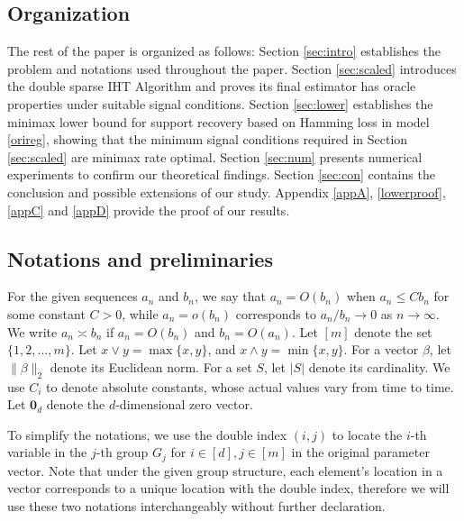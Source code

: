 \documentclass[12pt]{article}
\begin{document}
\subsection{Organization} 
The rest of the paper is organized as follows:
Section \ref{sec:intro} establishes the problem and notations used throughout the paper.
Section \ref{sec:scaled} introduces the double sparse IHT Algorithm and proves its final estimator has oracle properties under suitable signal conditions.
Section \ref{sec:lower} establishes the minimax lower bound for support recovery based on Hamming loss in model \eqref{orireg}, showing that the minimum signal conditions required in Section \ref{sec:scaled} are minimax rate optimal.
Section \ref{sec:num} presents numerical experiments to confirm our theoretical findings.
Section \ref{sec:con} contains the conclusion and possible extensions of our study.
Appendix \ref{appA}, \ref{lowerproof}, \ref{appC} and \ref{appD} provide the proof of our results.


\subsection{Notations and preliminaries}\label{sec: pre}
For the given sequences $a_n$ and $b_n$, we say that $a_n = O(b_n)$ when $a_n \le Cb_n$ for some constant $C>0$, while $a_n = o(b_n)$ corresponds to ${a_n}/{b_n} \rightarrow 0$ as $n \to \infty$.
We write $a_n \asymp b_n$ if $a_n = O(b_n)$ and $b_n  = O(a_n)$.
Let $[m]$ denote the set $\{1,2,\ldots,m\}$.
Let $x \vee y= \max\{x,y\} $, and $x \wedge y = \min \{x,y \}$.
For a vector $\beta$, let $\|\beta \|_2$ denote its Euclidean norm.
For a set $S$, let $|S|$ denote its cardinality.
We use $C_i$ to denote absolute constants, whose actual values vary from time to time.
Let $\mathbf{0}_d$ denote the $d$-dimensional zero vector.

To simplify the notations, we use the double index $(i,j)$ to locate the $i$-th variable in the $j$-th group $G_j$ for $i \in [d], j \in [m]$ in the original parameter vector.
Note that under the given group structure, each element's location in a vector corresponds to a unique location with the double index, therefore we will use these two notations interchangeably without further declaration.
\end{document}

